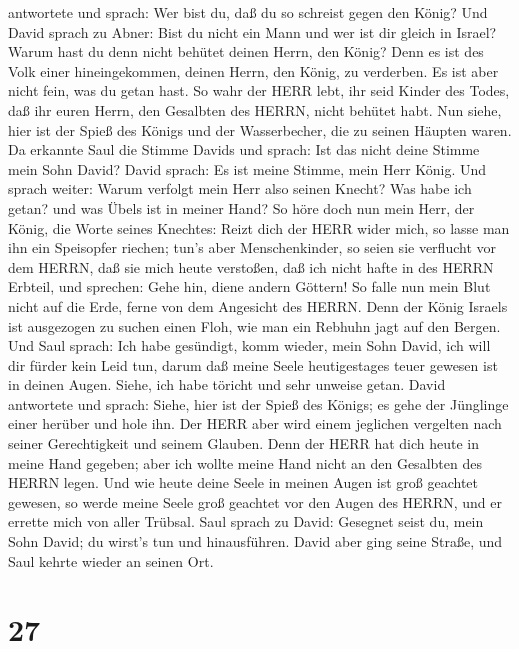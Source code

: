 antwortete und sprach: Wer bist du, daß du so schreist gegen den König?
 Und David sprach zu Abner: Bist du nicht ein Mann und wer
ist dir gleich in Israel? Warum hast du denn nicht behütet deinen Herrn,
den König? Denn es ist des Volk einer hineingekommen, deinen Herrn, den
König, zu verderben.  Es ist aber nicht fein, was du getan
hast. So wahr der HERR lebt, ihr seid Kinder des Todes, daß ihr euren
Herrn, den Gesalbten des HERRN, nicht behütet habt. Nun siehe, hier ist
der Spieß des Königs und der Wasserbecher, die zu seinen Häupten waren.
 Da erkannte Saul die Stimme Davids und sprach: Ist das
nicht deine Stimme mein Sohn David? David sprach: Es ist meine Stimme,
mein Herr König.  Und sprach weiter: Warum verfolgt mein
Herr also seinen Knecht? Was habe ich getan? und was Übels ist in meiner
Hand?  So höre doch nun mein Herr, der König, die Worte
seines Knechtes: Reizt dich der HERR wider mich, so lasse man ihn ein
Speisopfer riechen; tun's aber Menschenkinder, so seien sie verflucht
vor dem HERRN, daß sie mich heute verstoßen, daß ich nicht hafte in des
HERRN Erbteil, und sprechen: Gehe hin, diene andern Göttern!
 So falle nun mein Blut nicht auf die Erde, ferne von dem
Angesicht des HERRN. Denn der König Israels ist ausgezogen zu suchen
einen Floh, wie man ein Rebhuhn jagt auf den Bergen.  Und
Saul sprach: Ich habe gesündigt, komm wieder, mein Sohn David, ich will
dir fürder kein Leid tun, darum daß meine Seele heutigestages teuer
gewesen ist in deinen Augen. Siehe, ich habe töricht und sehr unweise
getan.  David antwortete und sprach: Siehe, hier ist der
Spieß des Königs; es gehe der Jünglinge einer herüber und hole ihn.
 Der HERR aber wird einem jeglichen vergelten nach seiner
Gerechtigkeit und seinem Glauben. Denn der HERR hat dich heute in meine
Hand gegeben; aber ich wollte meine Hand nicht an den Gesalbten des
HERRN legen.  Und wie heute deine Seele in meinen Augen ist
groß geachtet gewesen, so werde meine Seele groß geachtet vor den Augen
des HERRN, und er errette mich von aller Trübsal.  Saul
sprach zu David: Gesegnet seist du, mein Sohn David; du wirst's tun und
hinausführen. David aber ging seine Straße, und Saul kehrte wieder an
seinen Ort.

\hypertarget{section-26}{%
\section{27}\label{section-26}}

